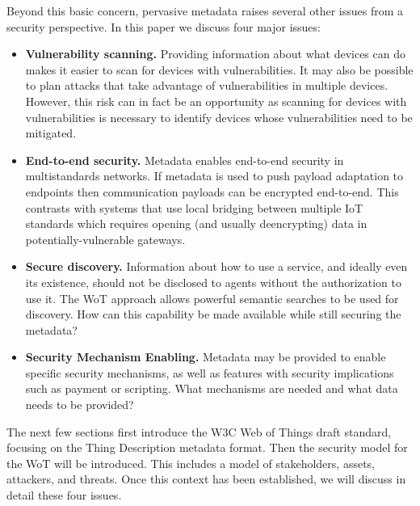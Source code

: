 Beyond this basic concern, pervasive metadata raises several other issues
from a security perspective.  In this paper we discuss four major issues:
\begin{itemize}
\item \textbf{Vulnerability scanning.}
Providing information about what devices can do makes it easier to scan for devices with 
vulnerabilities.  It may also be possible to plan attacks that take advantage of vulnerabilities
in multiple devices. 
However, this risk can in fact be an opportunity as scanning for devices with
vulnerabilities is necessary to identify devices whose vulnerabilities need to be mitigated.
\item \textbf{End-to-end security.}
Metadata enables end-to-end security in multistandards networks.
If metadata is used to push payload adaptation to endpoints then 
communication payloads can be encrypted end-to-end.  This contrasts
with systems that use local bridging between multiple IoT standards
which requires opening (and usually deencrypting) data in potentially-vulnerable gateways.
\item \textbf{Secure discovery.}
Information about how to use a service, and ideally even its existence, should not
be disclosed to agents without the authorization to use it.
The WoT approach allows powerful semantic searches to be used for discovery.
How can this capability be made available while still securing the metadata?
\item \textbf{Security Mechanism Enabling.}
Metadata may be provided to enable specific security mechanisms,
as well as features with security implications such as payment or scripting.
What mechanisms are needed and what data needs to be provided?
\end{itemize}

The next few sections first introduce the W3C Web of Things draft standard,
focusing on the Thing Description metadata format.  
Then the security model for the WoT will be introduced.
This includes a model of stakeholders, assets, attackers, and threats.
Once this context has been established, we will discuss in detail these
four issues.

